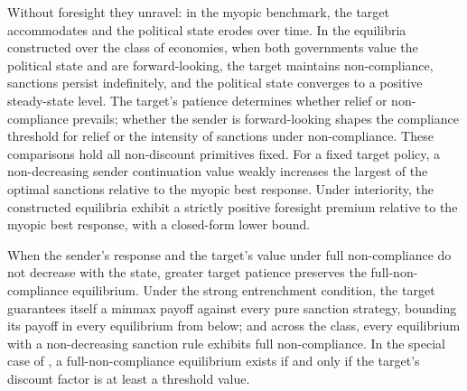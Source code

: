  Without foresight they unravel: in the
myopic benchmark, the target accommodates and the political state erodes over time. In
the equilibria constructed over the class of economies, when both governments value the
political state and are forward-looking, the target maintains non-compliance, sanctions
persist indefinitely, and the political state converges to a positive steady-state
level. The target's patience determines whether relief or non-compliance prevails;
whether the sender is forward-looking shapes the compliance threshold for relief or the
intensity of sanctions under non-compliance. These comparisons hold all non-discount
primitives fixed. For a fixed target policy, a non-decreasing sender continuation value
weakly increases the largest of the optimal sanctions relative to the myopic best response. Under
interiority, the constructed equilibria exhibit a strictly positive foresight premium
relative to the myopic best response, with a closed-form lower bound.

 When
the sender's response and the target's value under full non-compliance do not decrease
with the state, greater target patience preserves the full-non-compliance equilibrium.
Under the strong entrenchment condition, the target guarantees itself a minmax payoff
against every pure sanction strategy, bounding its payoff in every equilibrium from
below; and across the class, every equilibrium with a non-decreasing sanction rule
exhibits full non-compliance. In the special case of , a
full-non-compliance equilibrium exists if and only if the target's discount factor is at
least a threshold value.


